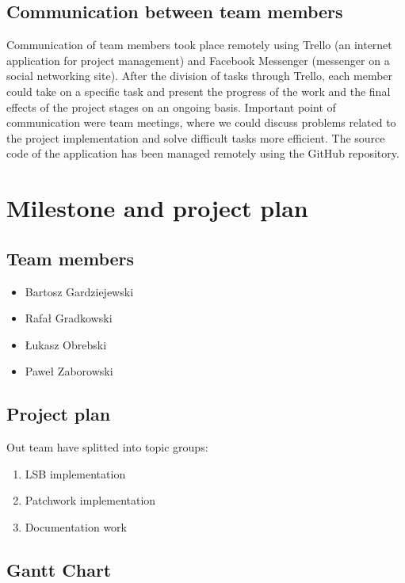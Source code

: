 \documentclass[a4paper, 12pt]{article}
\begin{document}
\subsection{Communication between team members}
Communication of team members took place remotely using Trello (an internet
application for project management) and Facebook Messenger (messenger on a social
networking site). After the division of tasks through Trello, each member could take on	a specific task and present the progress of the work and the final effects of the project stages on an ongoing basis. Important point of communication were team meetings, where we could discuss problems related to the project implementation and solve difficult tasks more efficient. The source code of the application has been managed remotely using the GitHub repository.
	
\section{Milestone and project plan}

	\subsection{Team members}
	
	\begin{itemize}
		\item Bartosz Gardziejewski
		\item Rafał Gradkowski
		\item Łukasz Obrebski
		\item Paweł Zaborowski
	\end{itemize}

	\subsection{Project plan}
	
	Out team have splitted into topic groups:
	
	\begin{enumerate}
		\item LSB implementation
		\item Patchwork implementation
		\item Documentation work
	\end{enumerate}
	

	\subsection{Gantt Chart}
	
\end{document}
